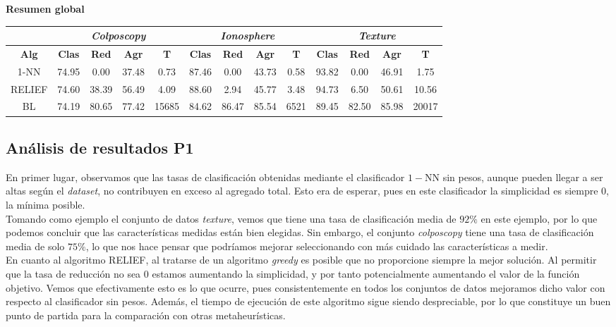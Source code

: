 \documentclass[12pt]{article}
\begin{document}
\textbf{Resumen global}

\begin{table}[h]
\begin{tabular}{ccccc|cccc|cccc}
 & \multicolumn{4}{c}{\textit{Colposcopy}} & \multicolumn{4}{c}{\textit{Ionosphere}} & \multicolumn{4}{c}{\textit{Texture}} \\ \hline
\textbf{Alg} & \textbf{Clas} & \textbf{Red} & \textbf{Agr} & \textbf{T} & \textbf{Clas} & \textbf{Red} & \textbf{Agr} & \textbf{T} & \textbf{Clas} & \textbf{Red} & \textbf{Agr} & \textbf{T} \\ \hline
1-NN & 74.95 & 0.00 & 37.48 & 0.73 & 87.46 & 0.00 & 43.73 & 0.58 & 93.82 & 0.00 & 46.91 & 1.75\\
RELIEF & 74.60 & 38.39 & 56.49 & 4.09 & 88.60 & 2.94 & 45.77 & 3.48 & 94.73 & 6.50 & 50.61 & 10.56\\
BL & 74.19 & 80.65 & 77.42 & 15685 & 84.62 & 86.47 & 85.54 & 6521 & 89.45 & 82.50 & 85.98 & 20017\\
\end{tabular}
\end{table}

\subsection*{{\color{red}Análisis de resultados P1}}

En primer lugar, observamos que las tasas de clasificación obtenidas mediante el clasificador $1-$NN sin pesos, aunque pueden llegar a ser altas según el \textit{dataset}, no contribuyen en exceso al agregado total. Esto era de esperar, pues en este clasificador la simplicidad es siempre $0$, la mínima posible.\\

Tomando como ejemplo el conjunto de datos \textit{texture}, vemos que tiene una tasa de clasificación media de $92\%$ en este ejemplo, por lo que podemos concluir que las características medidas están bien elegidas. Sin embargo, el conjunto \textit{colposcopy} tiene una tasa de clasificación media de solo $75\%$, lo que nos hace pensar que podríamos mejorar seleccionando con más cuidado las características a medir.\\

En cuanto al algoritmo RELIEF, al tratarse de un algoritmo \textit{greedy} es posible que no proporcione siempre la mejor solución. Al permitir que la tasa de reducción no sea $0$ estamos aumentando la simplicidad, y por tanto potencialmente aumentando el valor de la función objetivo. Vemos que efectivamente esto es lo que ocurre, pues consistentemente en todos los conjuntos de datos mejoramos dicho valor con respecto al clasificador sin pesos. Además, el tiempo de ejecución de este algoritmo sigue siendo despreciable, por lo que constituye un buen punto de partida para la comparación con otras metaheurísticas.\\
\end{document}
